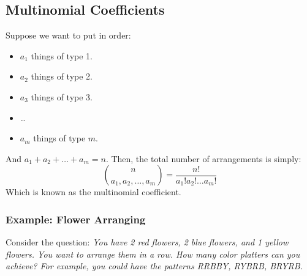 \documentclass[letterpaper]{article}
\begin{document}
\subsection{Multinomial Coefficients}
Suppose we want to put in order:
\begin{itemize}
    \item $a_1$ things of type 1.
    \item $a_2$ things of type 2.
    \item $a_3$ things of type 3. 
    \item \dots
    \item $a_m$ things of type $m$.
\end{itemize}
And $a_1 + a_2 + \dots + a_m = n$. Then, the total number of arrangements is simply:
\[\binom{n}{a_1, a_2, \dots, a_m} = \frac{n!}{a_{1}!a_{2}! \dots a_{m}!}\]
Which is known as the multinomial coefficient.

\subsubsection{Example: Flower Arranging}
Consider the question: \emph{You have 2 red flowers, 2 blue flowers, and 1 yellow flowers. You want to arrange them in a row. How many color platters can you achieve? For example, you could have the patterns RRBBY, RYBRB, BRYRB.} 
\end{document}
